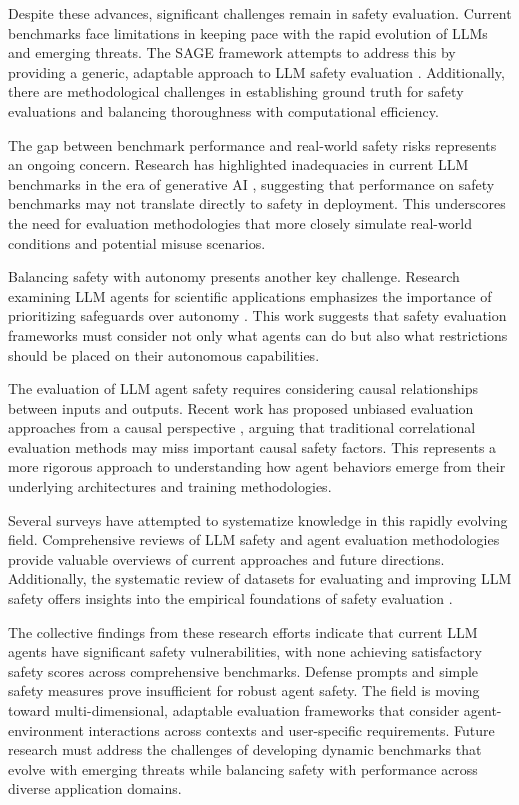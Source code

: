 \documentclass[conference]{IEEEtran}
\begin{document}
Despite these advances, significant challenges remain in safety evaluation. Current benchmarks face limitations in keeping pace with the rapid evolution of LLMs and emerging threats. The SAGE framework attempts to address this by providing a generic, adaptable approach to LLM safety evaluation \cite{2504.19674}. Additionally, there are methodological challenges in establishing ground truth for safety evaluations and balancing thoroughness with computational efficiency.

The gap between benchmark performance and real-world safety risks represents an ongoing concern. Research has highlighted inadequacies in current LLM benchmarks in the era of generative AI \cite{2402.09880}, suggesting that performance on safety benchmarks may not translate directly to safety in deployment. This underscores the need for evaluation methodologies that more closely simulate real-world conditions and potential misuse scenarios.

Balancing safety with autonomy presents another key challenge. Research examining LLM agents for scientific applications emphasizes the importance of prioritizing safeguards over autonomy \cite{2402.04247}. This work suggests that safety evaluation frameworks must consider not only what agents can do but also what restrictions should be placed on their autonomous capabilities.

The evaluation of LLM agent safety requires considering causal relationships between inputs and outputs. Recent work has proposed unbiased evaluation approaches from a causal perspective \cite{2502.06655}, arguing that traditional correlational evaluation methods may miss important causal safety factors. This represents a more rigorous approach to understanding how agent behaviors emerge from their underlying architectures and training methodologies.

Several surveys have attempted to systematize knowledge in this rapidly evolving field. Comprehensive reviews of LLM safety \cite{2412.17686} and agent evaluation methodologies \cite{2503.16416} provide valuable overviews of current approaches and future directions. Additionally, the systematic review of datasets for evaluating and improving LLM safety offers insights into the empirical foundations of safety evaluation \cite{2404.05399}.

The collective findings from these research efforts indicate that current LLM agents have significant safety vulnerabilities, with none achieving satisfactory safety scores across comprehensive benchmarks. Defense prompts and simple safety measures prove insufficient for robust agent safety. The field is moving toward multi-dimensional, adaptable evaluation frameworks that consider agent-environment interactions across contexts and user-specific requirements. Future research must address the challenges of developing dynamic benchmarks that evolve with emerging threats while balancing safety with performance across diverse application domains.
\end{document}

